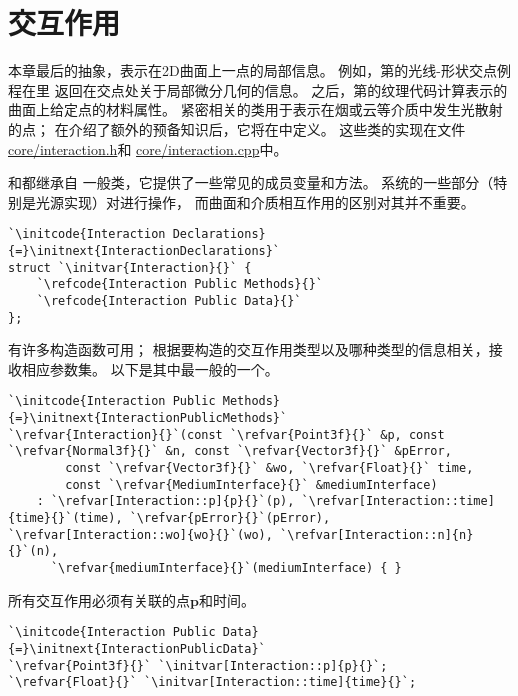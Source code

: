 \section{交互作用}\label{sec:交互作用}

本章最后的抽象，表示在2D曲面上一点的局部信息。
例如，第的光线-形状交点例程在里
返回在交点处关于局部微分几何的信息。
之后，第的纹理代码计算表示的曲面上给定点的材料属性。
紧密相关的类用于表示在烟或云等介质中发生光散射的点；
在介绍了额外的预备知识后，它将在中定义。
这些类的实现在文件\href{https://github.com/mmp/pbrt-v3/tree/master/src/core/interaction.h}{\ttfamily core/interaction.h}和
\href{https://github.com/mmp/pbrt-v3/tree/master/src/core/interaction.cpp}{\ttfamily core/interaction.cpp}中。

和都继承自
一般类，它提供了一些常见的成员变量和方法。
系统的一些部分（特别是光源实现）对进行操作，
而曲面和介质相互作用的区别对其并不重要。

\begin{lstlisting}
`\initcode{Interaction Declarations}{=}\initnext{InteractionDeclarations}`
struct `\initvar{Interaction}{}` {
    `\refcode{Interaction Public Methods}{}`
    `\refcode{Interaction Public Data}{}`
};
\end{lstlisting}

有许多构造函数可用；
根据要构造的交互作用类型以及哪种类型的信息相关，接收相应参数集。
以下是其中最一般的一个。
\begin{lstlisting}
`\initcode{Interaction Public Methods}{=}\initnext{InteractionPublicMethods}`
`\refvar{Interaction}{}`(const `\refvar{Point3f}{}` &p, const `\refvar{Normal3f}{}` &n, const `\refvar{Vector3f}{}` &pError,
        const `\refvar{Vector3f}{}` &wo, `\refvar{Float}{}` time,
        const `\refvar{MediumInterface}{}` &mediumInterface)
    : `\refvar[Interaction::p]{p}{}`(p), `\refvar[Interaction::time]{time}{}`(time), `\refvar{pError}{}`(pError), `\refvar[Interaction::wo]{wo}{}`(wo), `\refvar[Interaction::n]{n}{}`(n),
      `\refvar{mediumInterface}{}`(mediumInterface) { }
\end{lstlisting}

所有交互作用必须有关联的点$\bm p$和时间。
\begin{lstlisting}
`\initcode{Interaction Public Data}{=}\initnext{InteractionPublicData}`
`\refvar{Point3f}{}` `\initvar[Interaction::p]{p}{}`;
`\refvar{Float}{}` `\initvar[Interaction::time]{time}{}`;
\end{lstlisting}

